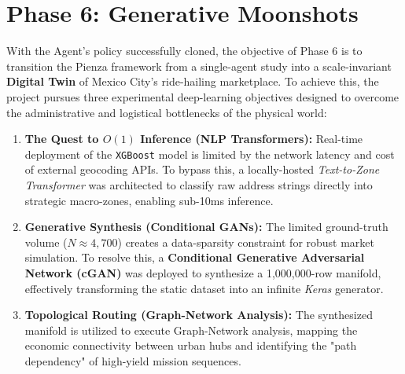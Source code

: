 \section{Phase 6: Generative Moonshots}

With the Agent's policy successfully cloned, the objective of Phase 6 is to transition the Pienza framework from a single-agent study into a scale-invariant \textbf{Digital Twin} of Mexico City's ride-hailing marketplace. To achieve this, the project pursues three experimental deep-learning objectives designed to overcome the administrative and logistical bottlenecks of the physical world:

\begin{enumerate}
    \item \textbf{The Quest to $O(1)$ Inference (NLP Transformers):} Real-time deployment of the \texttt{XGBoost} model is limited by the network latency and cost of external geocoding APIs. To bypass this, a locally-hosted \textit{Text-to-Zone Transformer} was architected to classify raw address strings directly into strategic macro-zones, enabling sub-10ms inference.
    
    \item \textbf{Generative Synthesis (Conditional GANs):} The limited ground-truth volume ($N \approx 4,700$) creates a data-sparsity constraint for robust market simulation. To resolve this, a \textbf{Conditional Generative Adversarial Network (cGAN)} was deployed to synthesize a 1,000,000-row manifold, effectively transforming the static dataset into an infinite \textit{Keras} generator.
    
    \item \textbf{Topological Routing (Graph-Network Analysis):} The synthesized manifold is utilized to execute Graph-Network analysis, mapping the economic connectivity between urban hubs and identifying the "path dependency" of high-yield mission sequences.
\end{enumerate}


